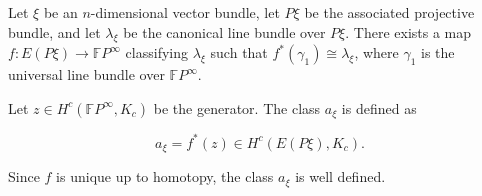 Let $\xi$ be an $n$-dimensional vector bundle, let $P\xi$ be the associated projective bundle, and let $\lambda_\xi$ be the canonical line bundle over $P\xi$. There exists a map $f: E(P\xi) \to \mathbb{F}P^\infty$ classifying $\lambda_\xi$ such that $f^*(\gamma_1) \cong \lambda_\xi$, where $\gamma_1$ is the universal line bundle over $\mathbb{F}P^\infty$.

Let $z \in H^c(\mathbb{F}P^\infty, K_c)$ be the generator. The class $a_{\xi}$ is defined as

$$a_{\xi} = f^*(z) \in H^c(E(P\xi), K_c).$$

Since $f$ is unique up to homotopy, the class $a_{\xi}$ is well defined.
